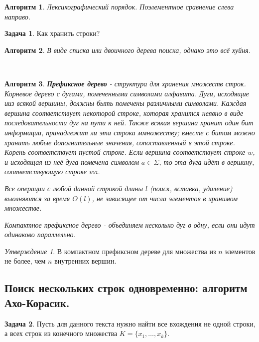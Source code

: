 \documentclass[a4paper]{article}
\theoremstyle{indented}
\newtheorem{alg}{Алгоритм}
\theoremstyle{definition}
\newtheorem{prob}{Задача}
\theoremstyle{remark}
\newtheorem{stat}{Утверждение}
\begin{document}
\begin{alg}
    \textit{Лексикографический порядок.} Поэлементное сравнение слева направо.
\end{alg}

\begin{prob}
    Как хранить строки?
\end{prob}

\begin{alg}
    В виде списка или двоичного дерева поиска, однако это всё хуйня.
\end{alg} \ 

\begin{alg}
    \textbf{Префиксное дерево} - структура для хранения множеств строк. Корневое дерево с дугами, помеченными символами алфавита. Дуги, исходящие ииз всякой вершины, должны быть помечены различными символами. Каждая вершина соответствует некоторой строке, которая хранится неявно в виде последовательности дуг на пути к ней. Также всякая вершина хранит один бит информации, принадлежит ли эта строка ммножеству; вместе с битом можно хранить любые дополнительные значения, сопоставленный в этой строке. Корень соответствует пустой строке. Если вершина соответствует строке $w$, и исходящая из неё дуга помечена символом $a\in \Sigma$, то эта дуга идёт в вершину, соответствующую строке $wa$. \ 

    Все операции с любой данной строкой длины $l$ (поиск, вставка, удаление) выолняются за время $O(l)$, не зависящее от числа элементов в хранимом множестве. \ 

    \textit{Компактное префиксное дерево} - объединяем несколько дуг в одну, если они идут одинаково параллельно.
\end{alg}

\begin{stat}
    В компактном префиксном дереве для множества из $n$ элементов не более, чем $n$ внутренних вершин.
\end{stat}

\subsection{Поиск нескольких строк одновременно: алгоритм Ахо-Корасик.}

\begin{prob}
    Пусть для данного текста нужно найти все вхождения не одной строки, а всех строк из конечного множества $K=\{x_1, \ldots, x_k\}$. 
\end{prob}
\end{document}
